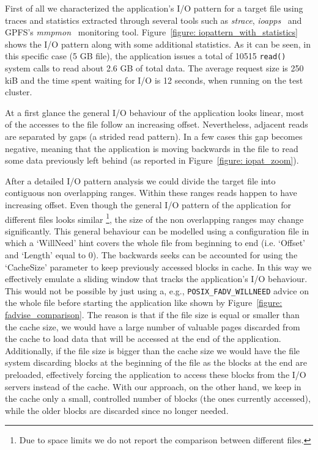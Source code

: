 First of all we characterized the application's I/O pattern for a target file using traces and statistics extracted through several tools such as \textit{strace}, \textit{ioapps}~\cite{ioapps} and GPFS's \textit{mmpmon}~\cite{mmpmon} monitoring tool. 
Figure~\ref{figure: iopattern_with_statistics} shows the I/O pattern along with some additional statistics. As it can be seen, in this specific case (5 GB file), the application issues a total of 10515 \texttt{read()} system calls to read about 2.6 GB of 
total data. The average request size is 250 kiB and the time spent waiting for I/O is 12 seconds, when running on the test cluster. 

At a first glance the general I/O behaviour of the application looks linear, most of the accesses to the file follow an increasing offset. Nevertheless, adjacent reads are separated by gaps (a strided read pattern). In a few cases this gap becomes negative, 
meaning that the application is moving backwards in the file to read some data previously left behind (as reported in Figure~\ref{figure: iopat_zoom}).

After a detailed I/O pattern analysis we could divide the target file into contiguous non overlapping ranges. Within these ranges reads happen to have increasing offset. Even though the general I/O pattern of the application for different files looks similar
\footnote{Due to space limits we do not report the comparison between different files.}, the size of the non overlapping ranges may change significantly. This general behaviour can be modelled using a configuration file in which a `WillNeed' hint covers the 
whole file from beginning to end (i.e. `Offset' and `Length' equal to 0). The backwards seeks can be accounted for using the `CacheSize' parameter to keep previously accessed blocks in cache. In this way we effectively emulate a sliding window that tracks the 
application's I/O behaviour. This would not be possible by just using a, e.g., \texttt{POSIX\_FADV\_WILLNEED} advice on the whole file before starting the application like shown by Figure~\ref{figure: fadvise_comparison}. The reason is that if the file size 
is equal or smaller than the cache size, we would have a large number of valuable pages discarded from the cache to load data that will be accessed at the end of the application. Additionally, if the file size is bigger than the cache size we would have the 
file system discarding blocks at the beginning of the file as the blocks at the end are preloaded, effectively forcing the application to access these blocks from the I/O servers instead of the cache. With our approach, on the other hand, we keep in the cache 
only a small, controlled number of blocks (the ones currently accessed), while the older blocks are discarded since no longer needed. 

